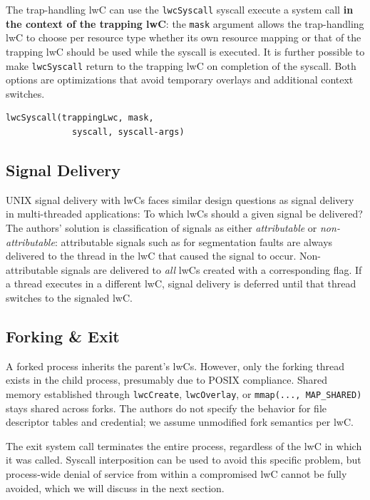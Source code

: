 \documentclass[10pt,twocolumn,a4paper]{article}
\begin{document}
The trap-handling lwC can use the \lstinline{lwcSyscall} syscall execute a system call \textbf{in the context of the trapping lwC}:
the \lstinline{mask} argument allows the trap-handling lwC to choose per resource type whether its own resource mapping or that of the trapping lwC should be used while the syscall is executed.
It is further possible to make \lstinline{lwcSyscall} return to the trapping lwC on completion of the syscall.
Both options are optimizations that avoid temporary overlays and additional context switches.
\cite{lwcpaper,lwckernelrepo}

\begin{lstlisting}[style=syscallinline]
  lwcSyscall(trappingLwc, mask,
             syscall, syscall-args)
\end{lstlisting}

\subsection{Signal Delivery}
UNIX signal delivery with lwCs faces similar design questions as signal delivery in multi-threaded applications: To which lwCs should a given signal be delivered?
The authors' solution is classification of signals as either \textit{attributable} or \textit{non-attributable}:
attributable signals such as for segmentation faults are always delivered to the thread in the lwC that caused the signal to occur.
Non-attributable signals are delivered to \textit{all} lwCs created with a corresponding flag.
If a thread executes in a different lwC, signal delivery is deferred until that thread switches to the signaled lwC.
\cite{lwcpaper}

\subsection{Forking \& Exit}
A forked process inherits the parent's lwCs.
However, only the forking thread exists in the child process, presumably due to POSIX compliance\cite{forkmultithread}. %
Shared memory established through \lstinline{lwcCreate}, \lstinline{lwcOverlay}, or \lstinline{mmap(..., MAP_SHARED)} stays shared across forks.
The authors do not specify the behavior for file descriptor tables and credential; we assume unmodified fork semantics per lwC.
\cite{lwcpaper}

The exit system call terminates the entire process, regardless of the lwC in which it was called.
Syscall interposition can be used to avoid this specific problem, but process-wide denial of service from within a compromised lwC cannot be fully avoided, which we will discuss in the next section.
\cite{lwcpaper}
\end{document}
